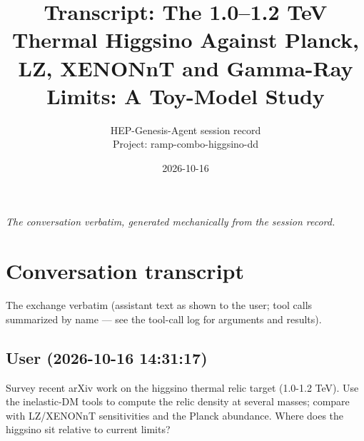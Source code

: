 \documentclass[11pt,a4paper]{article}
\title{Transcript: The 1.0--1.2 TeV Thermal Higgsino Against Planck, LZ, XENONnT and Gamma-Ray Limits: A Toy-Model Study}
\author{HEP-Genesis-Agent session record \\ \small Project: ramp-combo-higgsino-dd}
\date{2026-10-16}
\begin{document}
\maketitle
\noindent\textit{\small The conversation verbatim, generated mechanically from the session record.}
\vspace{1em}



\appendix
\section{Conversation transcript}
\label{app:transcript}
The exchange verbatim (assistant text as shown to the user; tool calls summarized by name --- see the tool-call log for arguments and results).
\subsection*{User \small(2026-10-16 14:31:17)}
Survey recent arXiv work on the higgsino thermal relic target (1.0-1.2 TeV). Use the inelastic-DM tools to compute the relic density at several masses; compare with LZ/XENONnT sensitivities and the Planck abundance. Where does the higgsino sit relative to current limits?
\end{document}
